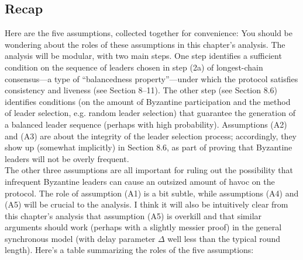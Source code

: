 \subsection{Recap}
Here are the five assumptions, collected together for convenience:
You should be wondering about the roles of these assumptions in this chapter’s analysis. The
analysis will be modular, with two main steps. One step identifies a sufficient condition on the
sequence of leaders chosen in step (2a) of longest-chain consensus—a type of “balancedness
property”—under which the protocol satisfies consistency and liveness (see Section 8–11).
The other step (see Section 8.6) identifies conditions (on the amount of Byzantine participation and the method of leader selection, e.g. random leader selection) that guarantee the
generation of a balanced leader sequence (perhaps with high probability). Assumptions (A2)
and (A3) are about the integrity of the leader selection process; accordingly, they show up
(somewhat implicitly) in Section 8.6, as part of proving that Byzantine leaders will not be
overly frequent.\\
The other three assumptions are all important for ruling out the possibility that infrequent Byzantine leaders can cause an outsized amount of havoc on the protocol. The role of
assumption (A1) is a bit subtle, while assumptions (A4) and (A5) will be crucial
to the analysis. I think it will also be intuitively clear from this chapter’s analysis that assumption (A5) is overkill and that similar arguments should work (perhaps with a slightly
messier proof) in the general synchronous model (with delay parameter $\Delta$ well less than the
typical round length). Here’s a table summarizing the roles of the five assumptions:
